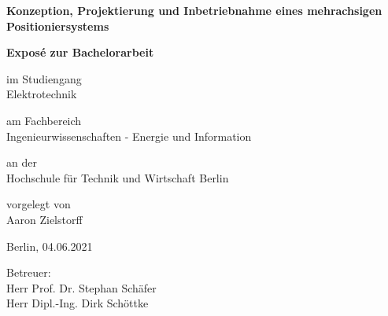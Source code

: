 \documentclass[12pt, a4paper, twoside]{article} %
\begin{document}
\begin{titlepage}
	\begin{center}
	\vspace*{0.2cm}
	
	\huge
	\textbf{Konzeption, Projektierung und Inbetriebnahme eines mehrachsigen Positioniersystems}
	
	\vspace*{2.0cm}
	\Large
	\textbf{Exposé zur Bachelorarbeit}
	
	\vspace*{1.2cm}
	\normalsize
	im Studiengang\\
	\Large
	Elektrotechnik
	
	\vspace*{0.9cm}
	\normalsize
	am Fachbereich\\
	\Large
	Ingenieurwissenschaften - Energie und Information
	
	\vspace*{0.9cm}
	\normalsize
	an der\\
	\Large
	Hochschule für Technik und Wirtschaft Berlin
	
	\vspace*{1.6cm}
	\normalsize
	vorgelegt von\\
	\Large
	Aaron Zielstorff
	
	\vspace*{0.7cm}
	\normalsize
	Berlin, 04.06.2021
	
	\vspace*{1.6cm}
	\normalsize
	Betreuer:\\
	Herr Prof. Dr. Stephan Schäfer\\
	Herr Dipl.-Ing. Dirk Schöttke
	
	\end{center}
\end{titlepage}


\setcounter{tocdepth}{2} %
\tableofcontents
\thispagestyle{empty}
\clearpage



\end{document}
